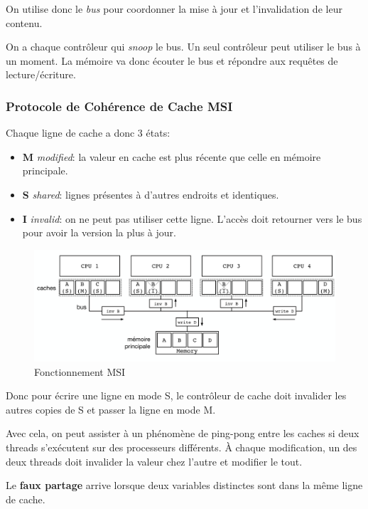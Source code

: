 On utilise donc le \emph{bus} pour coordonner la mise à jour et
l'invalidation de leur contenu.

On a chaque contrôleur qui \emph{snoop} le bus. Un seul contrôleur peut
utiliser le bus à un moment. La mémoire va donc écouter le bus et
répondre aux requêtes de lecture/écriture.

\subsubsection{Protocole de Cohérence de Cache
MSI}\label{protocole-de-cohuxe9rence-de-cache-msi}

Chaque ligne de cache a donc 3 états:

\begin{itemize}
\tightlist
\item
  \textbf{M} \emph{modified}: la valeur en cache est plus récente que
  celle en mémoire principale.
\item
  \textbf{S} \emph{shared}: lignes présentes à d'autres endroits et
  identiques.
\item
  \textbf{I} \emph{invalid}: on ne peut pas utiliser cette ligne.
  L'accès doit retourner vers le bus pour avoir la version la plus à
  jour.
\end{itemize}

\begin{figure}
\centering
\includegraphics{image-29-1.png}
\caption{Fonctionnement MSI}
\end{figure}

Donc pour écrire une ligne en mode S, le contrôleur de cache doit
invalider les autres copies de S et passer la ligne en mode M.

Avec cela, on peut assister à un phénomène de ping-pong entre les caches
si deux threads s'exécutent sur des processeurs différents. À chaque
modification, un des deux threads doit invalider la valeur chez l'autre
et modifier le tout.

Le \textbf{faux partage} arrive lorsque deux variables distinctes sont
dans la même ligne de cache.

